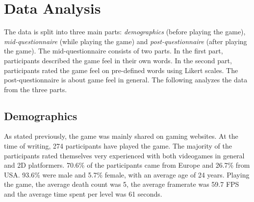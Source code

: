 \section{Data Analysis} \label{data}
The data is split into three main parts: \textit{demographics} (before playing the game), \textit{mid-questionnaire} (while playing the game) and \textit{post-questionnaire} (after playing the game). The mid-questionnaire consists of two parts. In the first part, participants described the game feel in their own words. In the second part, participants rated the game feel on pre-defined words using Likert scales. The post-questionnaire is about game feel in general. The following analyzes the data from the three parts.

\subsection{Demographics}
As stated previously, the game was mainly shared on gaming websites. At the time of writing, 274 participants have played the game. The majority of the participants rated themselves very experienced with both videogames in general and 2D platformers. 70.6\% of the participants came from Europe and 26.7\% from USA. 93.6\% were male and 5.7\% female, with an average age of 24 years. Playing the game, the average death count was 5, the average framerate was 59.7 FPS and the average time spent per level was 61 seconds.


